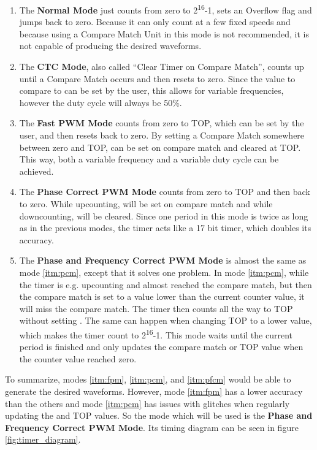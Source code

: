 \begin{enumerate}
    \item The \textbf{Normal Mode} just counts from zero to 2\textsuperscript{16}-1, sets an Overflow flag and jumps back to zero. Because it can only count at a few fixed speeds and because using a Compare Match Unit in this mode is not recommended, it is not capable of producing the desired waveforms.
    \item The \textbf{CTC Mode}, also called \enquote{Clear Timer on Compare Match}, counts up until a Compare Match occurs and then resets to zero. Since the value to compare to can be set by the user, this allows for variable frequencies, however the duty cycle will always be 50\%.
    \item The \textbf{Fast PWM Mode} counts from zero to TOP, which can be set by the user, and then resets back to zero. By setting a Compare Match somewhere between zero and TOP,  can be set on compare match and cleared at TOP. This way, both a variable frequency and a variable duty cycle can be achieved.\label{itm:fpm}
    \item The \textbf{Phase Correct PWM Mode} counts from zero to TOP and then back to zero. While upcounting,  will be set on compare match and while downcounting,  will be cleared. Since one period in this mode is twice as long as in the previous modes, the timer acts like a 17 bit timer, which doubles its accuracy.\label{itm:pcm} %
    \item The \textbf{Phase and Frequency Correct PWM Mode} is almost the same as mode \ref{itm:pcm}, except that it solves one problem. In mode \ref{itm:pcm}, while the timer is e.g. upcounting and almost reached the compare match, but then the compare match is set to a value lower than the current counter value, it will miss the compare match. The timer then counts all the way to TOP without setting . The same can happen when changing TOP to a lower value, which makes the timer count to 2\textsuperscript{16}-1. This mode waits until the current period is finished and only updates the compare match or TOP value when the counter value reached zero.\label{itm:pfcm}
\end{enumerate}

To summarize, modes \ref{itm:fpm}, \ref{itm:pcm}, and \ref{itm:pfcm} would be able to generate the desired waveforms. However, mode \ref{itm:fpm} has a lower accuracy than the others and mode \ref{itm:pcm} has issues with glitches when regularly updating the  and TOP values. So the mode which will be used is the \textbf{Phase and Frequency Correct PWM Mode}. Its timing diagram can be seen in figure \ref{fig:timer_diagram}.

